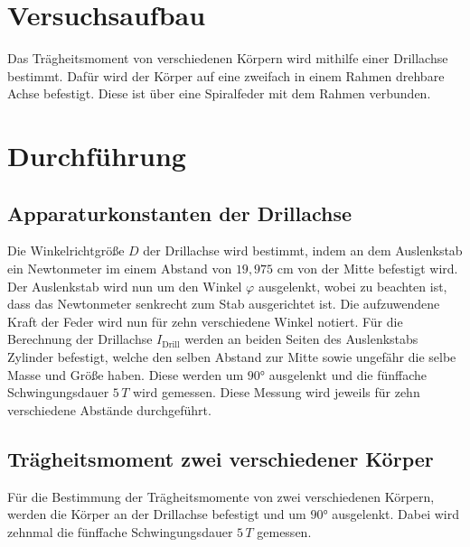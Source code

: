 
\section{Versuchsaufbau}
\label{sec:Versuchsaufbau}
Das Trägheitsmoment von verschiedenen Körpern wird mithilfe einer
Drillachse bestimmt. Dafür wird der Körper auf eine zweifach in einem Rahmen 
drehbare Achse befestigt. Diese ist über eine Spiralfeder mit dem Rahmen 
verbunden. %
%
\section{Durchführung}
\label{sec:Durchführung}
\subsection{Apparaturkonstanten der Drillachse}
\label{sec:Apparturkonstanten}
Die Winkelrichtgröße $D$ der Drillachse wird bestimmt, indem an dem Auslenkstab
ein Newtonmeter im einem Abstand von $19,975\,\,\unit{\centi\meter}$ von der Mitte 
befestigt wird. Der Auslenkstab wird nun um den Winkel $\varphi$ ausgelenkt, wobei zu beachten ist,
dass das Newtonmeter senkrecht zum Stab ausgerichtet ist. Die aufzuwendene Kraft der Feder wird nun
für zehn verschiedene Winkel notiert. Für die Berechnung der Drillachse $I_{\text{Drill}}$ werden an beiden Seiten des 
Auslenkstabs Zylinder befestigt, welche den selben Abstand zur Mitte sowie ungefähr die selbe Masse und Größe
haben. Diese werden um $90°$ ausgelenkt und die fünffache Schwingungsdauer $5\,T$ wird gemessen. Diese Messung
wird jeweils für zehn verschiedene Abstände durchgeführt.
%
\subsection{Trägheitsmoment zwei verschiedener Körper}
\label{sec:TragheitZweiKörper}
Für die Bestimmung der Trägheitsmomente von zwei verschiedenen Körpern, werden die Körper an der Drillachse
befestigt und um $90°$ ausgelenkt. Dabei wird zehnmal die fünffache Schwingungsdauer $5\,T$ gemessen. %
